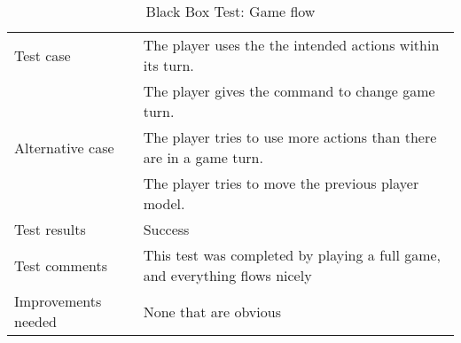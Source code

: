 {\begin{table}[H]
\begin{tabular}{| p{5cm} | p{10cm} |}
	Test case
		& The player uses the the intended actions within its turn. \\
		& The player gives the command to change game turn. \\ \hline
	Alternative case
		& The player tries to use more actions than there are in a game turn. \\
		& The player tries to move the previous player model. \\ \hline
	Test results 
		& Success \\ \hline
	Test comments
		& This test was completed by playing a full game, and everything flows nicely\\ \hline
	Improvements needed
		& None that are obvious \\ \hline
\end{tabular}


\caption{Black Box Test: Game flow}
\label{fig:black_box_test_5}
\end{table}}


